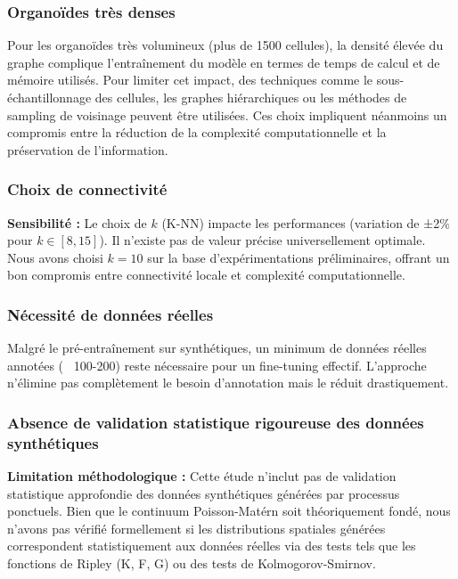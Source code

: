 \subsubsection{Organoïdes très denses}

Pour les organoïdes très volumineux (plus de 1500 cellules), la densité élevée du graphe complique l'entraînement du modèle en termes de temps de calcul et de mémoire utilisés. Pour limiter cet impact, des techniques comme le sous-échantillonnage des cellules, les graphes hiérarchiques ou les méthodes de sampling de voisinage peuvent être utilisées. Ces choix impliquent néanmoins un compromis entre la réduction de la complexité computationnelle et la préservation de l'information.

\subsubsection{Choix de connectivité}

\textbf{Sensibilité :}
Le choix de $k$ (K-NN) impacte les performances (variation de ±2\% pour $k \in [8, 15]$). Il n'existe pas de valeur précise universellement optimale. Nous avons choisi $k = 10$ sur la base d'expérimentations préliminaires, offrant un bon compromis entre connectivité locale et complexité computationnelle.

\subsubsection{Nécessité de données réelles}

Malgré le pré-entraînement sur synthétiques, un minimum de données réelles annotées (~ 100-200) reste nécessaire pour un fine-tuning effectif. L'approche n'élimine pas complètement le besoin d'annotation mais le réduit drastiquement.

\subsubsection{Absence de validation statistique rigoureuse des données synthétiques}

\textbf{Limitation méthodologique :}
Cette étude n'inclut pas de validation statistique approfondie des données synthétiques générées par processus ponctuels. Bien que le continuum Poisson-Matérn soit théoriquement fondé, nous n'avons pas vérifié formellement si les distributions spatiales générées correspondent statistiquement aux données réelles via des tests tels que les fonctions de Ripley (K, F, G) ou des tests de Kolmogorov-Smirnov.

